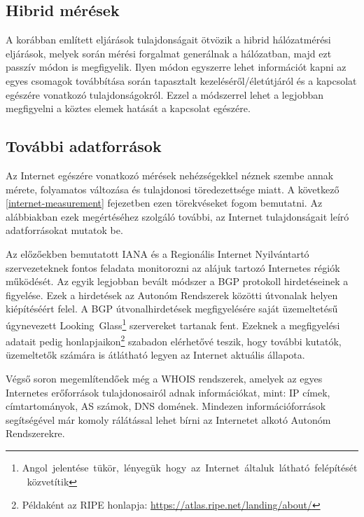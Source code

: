 \subsection{Hibrid mérések}

A korábban említett eljárások tulajdonságait ötvözik a hibrid hálózatmérési eljárások, melyek során mérési forgalmat generálnak a hálózatban, majd ezt passzív módon is megfigyelik. Ilyen módon egyszerre lehet információt kapni az egyes csomagok továbbítása során tapasztalt kezeléséről/életútjáról és a kapcsolat egészére vonatkozó tulajdonságokról. Ezzel a módszerrel lehet a legjobban megfigyelni a köztes elemek hatását a kapcsolat egészére.

\subsection{További adatforrások}

Az Internet egészére vonatkozó mérések nehézségekkel néznek szembe annak mérete, folyamatos változása és tulajdonosi töredezettsége miatt. A következő \ref{internet-measurement} fejezetben ezen törekvéseket fogom bemutatni. Az alábbiakban ezek megértéséhez szolgáló további, az Internet tulajdonságait leíró adatforrásokat mutatok be.

Az előzőekben bemutatott IANA és a Regionális Internet Nyilvántartó szervezeteknek fontos feladata monitorozni az alájuk tartozó Internetes régiók működését. Az egyik legjobban bevált módszer a BGP protokoll hirdetéseinek a figyelése. Ezek a hirdetések az Autonóm Rendszerek közötti útvonalak helyen kiépítéséért felel. A BGP útvonalhirdetések megfigyelésére saját üzemeltetésű úgynevezett \mbox{Looking Glass\footnote{Angol jelentése tükör, lényegük hogy az Internet általuk látható felépítését közvetítik}} szervereket tartanak fent. 
Ezeknek a megfigyelési adatait pedig honlapjaikon\footnote{Példaként az RIPE honlapja: \url{https://atlas.ripe.net/landing/about/}} szabadon elérhetővé teszik, hogy további kutatók, üzemeltetők számára is átlátható legyen az Internet aktuális állapota.

Végső soron megemlítendőek még a WHOIS rendszerek, amelyek az egyes Internetes erőforrások tulajdonosairól adnak információkat, mint: IP címek, címtartományok, AS számok, DNS domének. Mindezen információforrások segítségével már komoly rálátással lehet bírni az Internetet alkotó Autonóm Rendszerekre.







